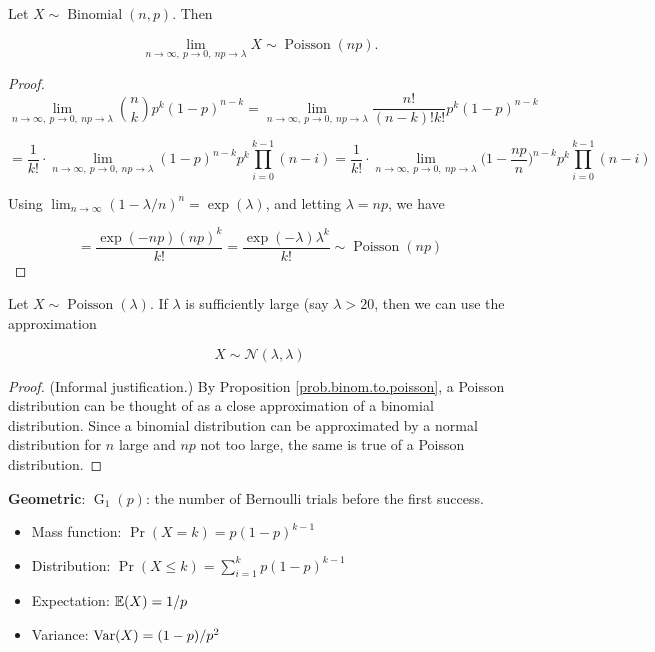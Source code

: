 \begin{proposition}\label{prob.binom.to.poisson}Let \(X \sim \operatorname{Binomial}(n, p)\). Then

\[
\lim_{n \to \infty, \ p \to 0, \ np \to \lambda} X \sim \operatorname{Poisson}(np).
\]

\end{proposition}

\begin{proof}
\[
\lim_{n \to \infty, \ p \to 0, \ np \to \lambda} \binom{n}{k}p^k(1-p)^{n-k} = \lim_{n \to \infty, \ p \to 0, \ np \to \lambda} \frac{n!}{(n-k)!k!} p^k(1-p)^{n-k} 
\]

\[
= \frac{1}{k!} \cdot \lim_{n \to \infty, \ p \to 0, \ np \to \lambda}  (1-p)^{n-k} p^k \prod_{i=0}^{k-1} (n-i)  = \frac{1}{k!} \cdot \lim_{n \to \infty, \ p \to 0, \ np \to \lambda}  \bigg(1-\frac{np}{n} \bigg)^{n-k} p^k \prod_{i=0}^{k-1} (n-i) 
\]

Using \(\lim_{n \to \infty} (1 - \lambda/n)^n = \exp(\lambda) \), and letting \(\lambda =np\), we have

\[
= \frac{\exp(-np)(np)^k}{k!} = \boxed{\frac{\exp(-\lambda)\lambda^k}{k!} } \sim \operatorname{Poisson}(np)
\]
\end{proof}

\begin{proposition}\label{prob.poisson.to.normal}
Let \(X \sim \operatorname{Poisson}(\lambda)\). If \(\lambda\) is sufficiently large (say \(\lambda > 20\), then we can use the approximation

\[
X \sim \mathcal{N}(\lambda, \lambda)
\]

\end{proposition}

\begin{proof}
(Informal justification.) By Proposition \ref{prob.binom.to.poisson}, a Poisson distribution can be thought of as a close approximation of a binomial distribution. Since a binomial distribution can be approximated by a normal distribution for \(n\) large and \(np\) not too large, the same is true of a Poisson distribution.
\end{proof}

\textbf{Geometric}:  \(\operatorname{G}_1(p)\): the number of Bernoulli trials before the first success.

\begin{itemize}

\item Mass function: \(\Pr(X = k) = p(1-p)^{k-1} \)

\item Distribution: \(\Pr(X \leq k) = \sum_{i=1}^k p(1-p)^{k-1}  \)

\item Expectation: \(\E(X) = 1/p \)

\item Variance: \(\Var(X) = (1-p)/p^2\)

\end{itemize}


